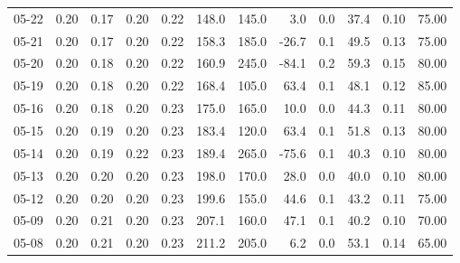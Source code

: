 \begin{threeparttable}
{\begin{tabular}{lrrrrrrrrrrr}
  05-22 &          0.20 &          0.17 &          0.20 &        0.22 &               148.0 &               145.0 &        3.0 &                 0.0 &             37.4 &            0.10 &                  75.00 \\
  05-21 &          0.20 &          0.17 &          0.20 &        0.22 &               158.3 &               185.0 &      -26.7 &                 0.1 &             49.5 &            0.13 &                  75.00 \\
  05-20 &          0.20 &          0.18 &          0.20 &        0.22 &               160.9 &               245.0 &      -84.1 &                 0.2 &             59.3 &            0.15 &                  80.00 \\
  05-19 &          0.20 &          0.18 &          0.20 &        0.22 &               168.4 &               105.0 &       63.4 &                 0.1 &             48.1 &            0.12 &                  85.00 \\
  05-16 &          0.20 &          0.18 &          0.20 &        0.23 &               175.0 &               165.0 &       10.0 &                 0.0 &             44.3 &            0.11 &                  80.00 \\
  05-15 &          0.20 &          0.19 &          0.20 &        0.23 &               183.4 &               120.0 &       63.4 &                 0.1 &             51.8 &            0.13 &                  80.00 \\
  05-14 &          0.20 &          0.19 &          0.22 &        0.23 &               189.4 &               265.0 &      -75.6 &                 0.1 &             40.3 &            0.10 &                  80.00 \\
  05-13 &          0.20 &          0.20 &          0.20 &        0.23 &               198.0 &               170.0 &       28.0 &                 0.0 &             40.0 &            0.10 &                  80.00 \\
  05-12 &          0.20 &          0.20 &          0.20 &        0.23 &               199.6 &               155.0 &       44.6 &                 0.1 &             43.2 &            0.11 &                  75.00 \\
  05-09 &          0.20 &          0.21 &          0.20 &        0.23 &               207.1 &               160.0 &       47.1 &                 0.1 &             40.2 &            0.10 &                  70.00 \\
  05-08 &          0.20 &          0.21 &          0.20 &        0.23 &               211.2 &               205.0 &        6.2 &                 0.0 &             53.1 &            0.14 &                  65.00 \\

\end{tabular}}
\end{threeparttable}
